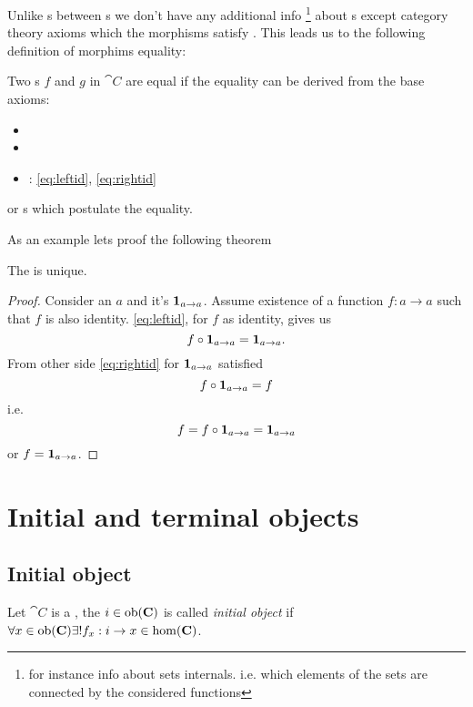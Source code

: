 Unlike s between s we don't
have any additional info 
\footnote{
for instance info about sets internals. i.e. which elements of the sets
are connected by the considered functions
}
about s except
category theory axioms which the morphisms satisfy 
\cite{bib:stackexchange:morphism:equality}. This leads us to the
following definition of morphims equality:
\begin{definition}
\label{def:morphism_equality}
Two s $f$ and $g$ in 
$\cat{C}$ are equal if the equality can be derived from the base axioms: 
\begin{itemize}
\item {}
\item {}
\item {}: \eqref{eq:leftid}, \eqref{eq:rightid}
\end{itemize}
or s which postulate the equality.
\end{definition}
As an example lets proof the following theorem
\begin{theorem}
\label{thm:identity_unique}
The  is unique.
\begin{proof}
Consider an  $a$ and it's  
$\mathbf{1}_{ a \to a }$. Assume existence of a function $f: a \to a$ such that $f$ is also
identity. \eqref{eq:leftid}, for $f$ as identity, gives us
\[
f \circ \mathbf{1}_{ a \to a } = \mathbf{1}_{ a \to a }.
\]
From other side \eqref{eq:rightid} for $\mathbf{1}_{ a \to a }$ satisfied
\[
f \circ \mathbf{1}_{ a \to a } = f
\]
i.e.
\[
f = f \circ \mathbf{1}_{ a \to a } = \mathbf{1}_{ a \to a }
\] 
or
$f = \mathbf{1}_{ a \to a }$.
\end{proof}
\end{theorem}

\section{Initial and terminal objects}

\subsection{Initial object}

\begin{definition}
\label{def:initial_object}
Let $\cat{C}$ is a , the
 $i \in \mathrm{ob}(\mathbf{C})$ is called
\textit{initial object} if $\forall x \in \mathrm{ob}(\mathbf{C})
\exists! f_x: i \to x \in \mathrm{hom}(\mathbf{C})$.
\end{definition}

